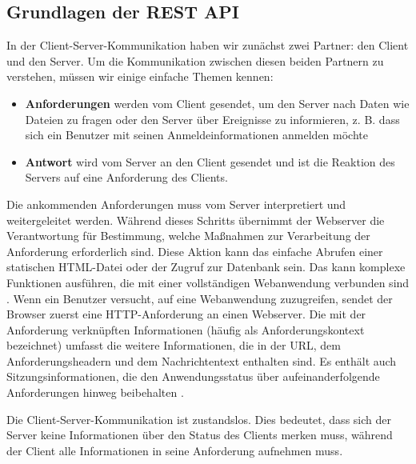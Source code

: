 \subsection{Grundlagen der REST API}
\label{sec:theorie:api}
In der Client-Server-Kommunikation haben wir zunächst zwei Partner: den Client und den Server. Um die Kommunikation zwischen diesen beiden Partnern zu verstehen, müssen wir einige einfache Themen kennen:
\begin{itemize}
\item \textbf{Anforderungen} werden vom Client gesendet, um den Server nach Daten wie Dateien zu fragen oder den Server über Ereignisse zu informieren, z. B. dass sich ein Benutzer mit seinen Anmeldeinformationen anmelden möchte
\item \textbf{Antwort} wird vom Server an den Client gesendet und ist die Reaktion des Servers auf eine Anforderung des Clients. 
\end{itemize}

Die ankommenden Anforderungen muss vom Server interpretiert und weitergeleitet werden. Während dieses Schritts übernimmt der Webserver die Verantwortung für Bestimmung, welche Maßnahmen zur Verarbeitung der Anforderung erforderlich sind. Diese Aktion kann das einfache Abrufen einer statischen HTML-Datei oder der Zugruf zur Datenbank sein. Das kann komplexe Funktionen ausführen, die mit einer vollständigen Webanwendung verbunden sind \cite[p.204]{shklar:webapplication}. Wenn ein Benutzer versucht, auf eine Webanwendung zuzugreifen, sendet der Browser zuerst eine HTTP-Anforderung an einen Webserver. Die mit der Anforderung verknüpften Informationen (häufig als Anforderungskontext bezeichnet) umfasst die weitere Informationen, die in der URL, dem Anforderungsheadern und dem Nachrichtentext enthalten sind. Es enthält auch Sitzungsinformationen, die den Anwendungsstatus über aufeinanderfolgende Anforderungen hinweg beibehalten \cite[p.205]{shklar:webapplication}.

Die Client-Server-Kommunikation ist zustandslos. Dies bedeutet, dass sich der Server keine Informationen über den Status des Clients merken muss, während der Client alle Informationen in seine Anforderung aufnehmen muss.


